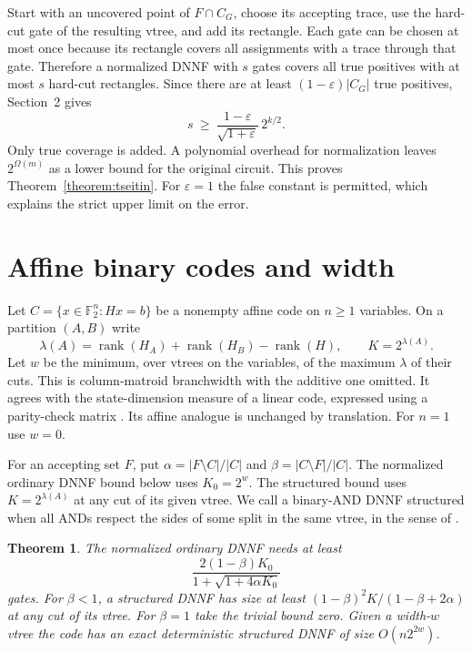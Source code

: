 \documentclass[11pt,a4paper]{amsart}
\newtheorem{theorem}{Theorem}
\newcommand{\F}{\mathbb F_2}
\newcommand{\rank}{\operatorname{rank}}
\begin{document}
Start with an uncovered point of $F\cap C_G$, choose its accepting trace, use the hard-cut gate of the resulting vtree, and add its rectangle. Each gate can be chosen at most once because its rectangle covers all assignments with a trace through that gate. Therefore a normalized DNNF with $s$ gates covers all true positives with at most $s$ hard-cut rectangles. Since there are at least $(1-\varepsilon)|C_G|$ true positives, Section~2 gives
\[
                  s\ \geq\ \frac{1-\varepsilon}{\sqrt{1+\varepsilon}}\,2^{k/2}.
\]
Only true coverage is added. A polynomial overhead for normalization leaves $2^{\Omega(m)}$ as a lower bound for the original circuit. This proves Theorem~\ref{theorem:tseitin}. For $\varepsilon=1$ the false constant is permitted, which explains the strict upper limit on the error.

\section{Affine binary codes and width}
Let $C=\{x\in\F^n:Hx=b\}$ be a nonempty affine code on $n\geq1$ variables. On a partition $(A,B)$ write
\[
    \lambda(A)=\rank(H_A)+\rank(H_B)-\rank(H),\qquad K=2^{\lambda(A)}.
\]
Let $w$ be the minimum, over vtrees on the variables, of the maximum $\lambda$ of their cuts. This is column-matroid branchwidth with the additive one omitted. It agrees with the state-dimension measure of a linear code, expressed using a parity-check matrix \cite[\S6, Eqs.~(23)--(24)]{kashyap}. Its affine analogue is unchanged by translation. For $n=1$ use $w=0$.

For an accepting set $F$, put $\alpha=|F\setminus C|/|C|$ and $\beta=|C\setminus F|/|C|$. The normalized ordinary DNNF bound below uses $K_0=2^w$. The structured bound uses $K=2^{\lambda(A)}$ at any cut of its given vtree. We call a binary-AND DNNF structured when all ANDs respect the sides of some split in the same vtree, in the sense of \cite{structured,rectangles}.

\newpage
\begin{theorem}\label{theorem:affine}
The normalized ordinary DNNF needs at least
\[
                 \frac{2(1-\beta)K_0}{1+\sqrt{1+4\alpha K_0}}
\]
gates. For $\beta<1$, a structured DNNF has size at least $(1-\beta)^2K/(1-\beta+2\alpha)$ at any cut of its vtree. For $\beta=1$ take the trivial bound zero. Given a width-$w$ vtree the code has an exact deterministic structured DNNF of size $O(n2^{2w})$.
\end{theorem}
\end{document}
